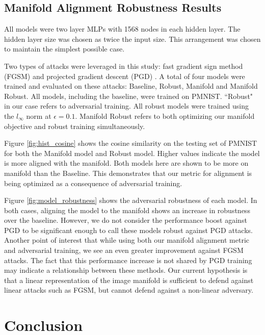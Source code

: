 \subsection{Manifold Alignment Robustness Results}

All models were two layer MLPs with 1568 nodes in each hidden layer.
The hidden layer size was chosen as twice the input size.
This arrangement was chosen to maintain the simplest possible case.

Two types of attacks were leveraged in this study: fast gradient sign method (FGSM) \citep{goodfellow2014fgsm} and projected gradient descent (PGD) \citep{madry2017pgd}.
A total of four models were trained and evaluated on these attacks: Baseline, Robust, Manifold and Manifold Robust.
All models, including the baseline, were trained on PMNIST.
``Robust" in our case refers to adversarial training.
All robust models were trained using the $l_\infty$ norm at $\epsilon = 0.1$.
Manifold Robust refers to both optimizing our manifold objective and robust training simultaneously.

Figure \ref{fig:hist_cosine} shows the cosine similarity on the testing set of PMNIST for both the Manifold model and Robust model.
Higher values indicate the model is more aligned with the manifold.
Both models here are shown to be more on manifold than the Baseline.
This demonstrates that our metric for alignment is being optimized as a consequence of adversarial training.

Figure \ref{fig:model_robustness} shows the adversarial robustness of each model.
In both cases, aligning the model to the manifold shows an increase in robustness over the baseline.
However, we do not consider the performance boost against PGD to be significant enough to call these models robust against PGD attacks.
Another point of interest that while using both our manifold alignment metric and adversarial training, we see an even greater improvement against FGSM attacks.
The fact that this performance increase is not shared by PGD training may indicate a relationship between these methods.
Our current hypothesis is that a linear representation of the image manifold is sufficient to defend against linear attacks such as FGSM, but cannot defend against a non-linear adversary.


\section{Conclusion}

